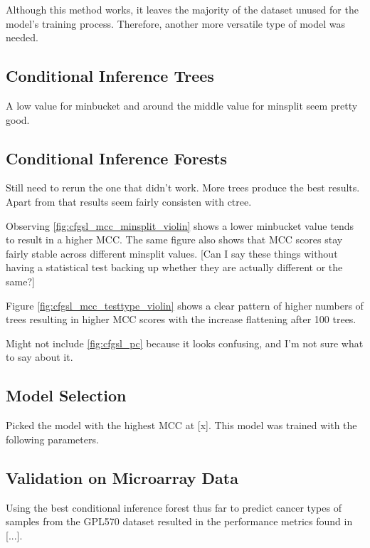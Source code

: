 Although this method works, it leaves the majority of the dataset unused for the model's training process.
Therefore, another more versatile type of model was needed.

\subsection{Conditional Inference Trees}




A low value for minbucket and around the middle value for minsplit seem pretty good.

\subsection{Conditional Inference Forests}




Still need to rerun the one that didn't work.
More trees produce the best results.
Apart from that results seem fairly consisten with ctree.


Observing \ref{fig:cfgsl_mcc_minsplit_violin} shows a lower minbucket value tends to result in a higher MCC.
The same figure also shows that MCC scores stay fairly stable across different minsplit values.
[Can I say these things without having a statistical test backing up whether they are actually different or the same?]


Figure \ref{fig:cfgsl_mcc_testtype_violin} shows a clear pattern of higher numbers of trees resulting in higher MCC scores with the increase flattening after 100 trees.

Might not include \ref{fig:cfgsl_pc} because it looks confusing, and I'm not sure what to say about it.

\subsection{Model Selection}
Picked the model with the highest MCC at [x]. This model was trained with the following parameters.



\subsection{Validation on Microarray Data}
Using the best conditional inference forest thus far to predict cancer types of samples from the GPL570 dataset resulted in the performance metrics found in [...].

